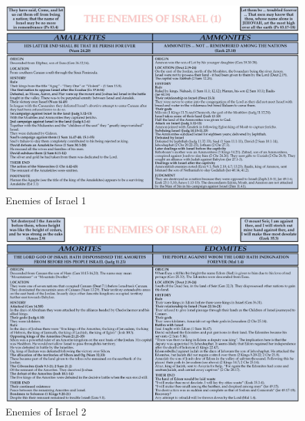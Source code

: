 \newpage
\begin{figure}
\begin{center}
\includegraphics[scale=0.4, angle=90]{06OT-Joshua/References/3.EnemiesOfIsrael1.jpg}
\caption[Enemies of Israel 1]{Enemies of Israel 1}
\label{fig:Enemies of Israel 1}
\end{center}
\end{figure}

\newpage
\begin{figure}
\begin{center}
\includegraphics[scale=0.4, angle=90]{06OT-Joshua/References/4.EnemiesOfIsrael2.jpg}
\caption[Enemies of Israel 2]{Enemies of Israel 2}
\label{fig:Enemies of Israel 2}
\end{center}
\end{figure}

